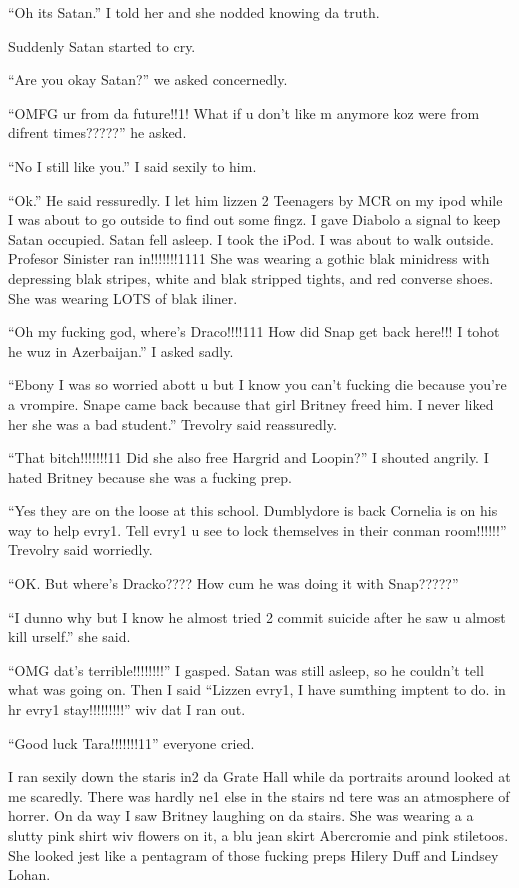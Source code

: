 \enquote{Oh its Satan.} I told her and she nodded knowing da truth.

Suddenly Satan started to cry.

\enquote{Are you okay Satan?} we asked concernedly.

\enquote{OMFG ur from da future!!1! What if u don't like m anymore koz were from difrent times?????} he asked.

\enquote{No I still like you.} I said sexily to him.

\enquote{Ok.} He said ressuredly. I let him lizzen 2 Teenagers by MCR on my ipod while I was about to go outside to find out some fingz. I gave Diabolo a signal to keep Satan occupied. Satan fell asleep. I took the iPod. I was about to walk outside. Profesor Sinister ran in!!!!!!!1111 She was wearing a gothic blak minidress with depressing blak stripes, white and blak stripped tights, and red converse shoes. She was wearing LOTS of blak iliner.

\enquote{Oh my fucking god, where's Draco!!!!111 How did Snap get back here!!! I tohot he wuz in Azerbaijan.} I asked sadly.

\enquote{Ebony I was so worried abott u but I know you can't fucking die because you're a vrompire. Snape came back because that girl Britney freed him. I never liked her she was a bad student.} Trevolry said reassuredly.

\enquote{That bitch!!!!!!!11 Did she also free Hargrid and Loopin?} I shouted angrily. I hated Britney because she was a fucking prep.

\enquote{Yes they are on the loose at this school. Dumblydore is back Cornelia is on his way to help evry1. Tell evry1 u see to lock themselves in their conman room!!!!!!} Trevolry said worriedly.

\enquote{OK\@. But where's Dracko???? How cum he was doing it with Snap?????}

\enquote{I dunno why but I know he almost tried 2 commit suicide after he saw u almost kill urself.} she said.

\enquote{OMG dat's terrible!!!!!!!!} I gasped. Satan was still asleep, so he couldn't tell what was going on. Then I said \enquote{Lizzen evry1, I have sumthing imptent to do. in hr evry1 stay!!!!!!!!!} wiv dat I ran out.

\enquote{Good luck Tara!!!!!!!11} everyone cried.

I ran sexily down the staris in2 da Grate Hall while da portraits around looked at me scaredly. There was hardly ne1 else in the stairs nd tere was an atmosphere of horrer. On da way I saw Britney laughing on da stairs. She was wearing a a slutty pink shirt wiv flowers on it, a blu jean skirt Abercromie and pink stiletoos. She looked jest like a pentagram of those fucking preps Hilery Duff and Lindsey Lohan.

